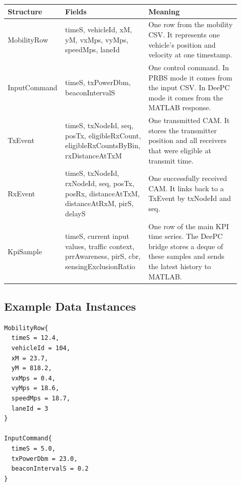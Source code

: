 \documentclass[11pt]{article}
\DeclareRobustCommand{\code}[1]{\texttt{\detokenize{#1}}}
\def\code#1{#1}%
\begin{document}
\begin{center}
\begin{longtable}{L{0.21\linewidth}L{0.30\linewidth}L{0.39\linewidth}}
\toprule
Structure & Fields & Meaning \\
\midrule
\endhead
\code{MobilityRow} &
\code{timeS}, \code{vehicleId}, \code{xM}, \code{yM}, \code{vxMps},
\code{vyMps}, \code{speedMps}, \code{laneId} &
One row from the mobility CSV.  It represents one vehicle's position and
velocity at one timestamp. \\
\code{InputCommand} &
\code{timeS}, \code{txPowerDbm}, \code{beaconIntervalS} &
One control command.  In PRBS mode it comes from the input CSV.  In DeePC mode it
comes from the MATLAB response. \\
\code{TxEvent} &
\code{timeS}, \code{txNodeId}, \code{seq}, \code{posTx},
\code{eligibleRxCount}, \code{eligibleRxCountsByBin},
\code{rxDistanceAtTxM} &
One transmitted CAM.  It stores the transmitter position and all receivers that
were eligible at transmit time. \\
\code{RxEvent} &
\code{timeS}, \code{txNodeId}, \code{rxNodeId}, \code{seq}, \code{posTx},
\code{posRx}, \code{distanceAtTxM}, \code{distanceAtRxM}, \code{pirS},
\code{delayS} &
One successfully received CAM.  It links back to a \code{TxEvent} by
\code{txNodeId} and \code{seq}. \\
\code{KpiSample} &
\code{timeS}, current input values, traffic context, \code{prrAwareness},
\code{pirS}, \code{cbr}, \code{sensingExclusionRatio} &
One row of the main KPI time series.  The DeePC bridge stores a deque of these
samples and sends the latest history to MATLAB. \\
\bottomrule
\end{longtable}
\end{center}

\subsection{Example Data Instances}

\begin{lstlisting}[style=textstyle, caption={Example mobility and input records.}]
MobilityRow{
  timeS = 12.4,
  vehicleId = 104,
  xM = 23.7,
  yM = 818.2,
  vxMps = 0.4,
  vyMps = 18.6,
  speedMps = 18.7,
  laneId = 3
}

InputCommand{
  timeS = 5.0,
  txPowerDbm = 23.0,
  beaconIntervalS = 0.2
}
\end{lstlisting}
\end{document}
